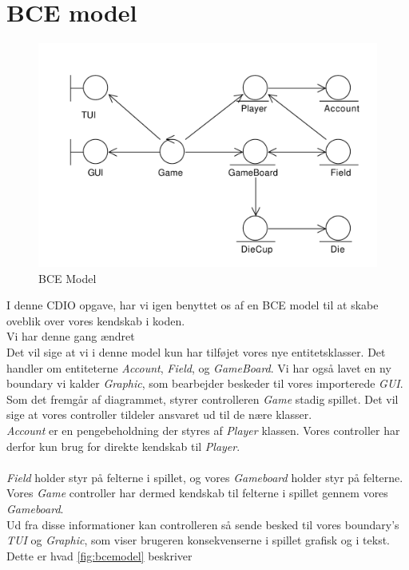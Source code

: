 \section{BCE model}
\begin{figure}[ht]
\centering
\includegraphics[width=1\textwidth]{BCEModel.pdf}
\caption[<Text for the list of figures>]{BCE Model}
\label{fig:bcemodel}
\end{figure}
I denne CDIO opgave, har vi igen benyttet os af en BCE model til at skabe oveblik over vores kendskab i koden.
\\
Vi har denne gang ændret 
\\
Det vil sige at vi i denne model kun har tilføjet vores nye entitetsklasser. Det handler om entiteterne \textit{Account}, \textit{Field}, og \textit{GameBoard}. Vi har også lavet en ny boundary vi kalder \textit{Graphic}, som bearbejder beskeder til vores importerede \textit{GUI}.
\\
Som det fremgår af diagrammet, styrer controlleren \textit{Game} stadig spillet. Det vil sige at vores controller tildeler ansvaret ud til de nære klasser.
\\
\textit{Account} er en pengebeholdning der styres af \textit{Player} klassen. Vores controller har derfor kun brug for direkte kendskab til \textit{Player}.
\\\\
\textit{Field} holder styr på felterne i spillet, og vores \textit{Gameboard} holder styr på felterne. Vores \textit{Game} controller har dermed kendskab til felterne i spillet gennem vores \textit{Gameboard}.
\\


Ud fra disse informationer kan controlleren så sende besked til vores boundary's \textit{TUI} og \textit{Graphic}, som viser brugeren konsekvenserne i spillet grafisk og i tekst. Dette er hvad \vref{fig:bcemodel} beskriver
